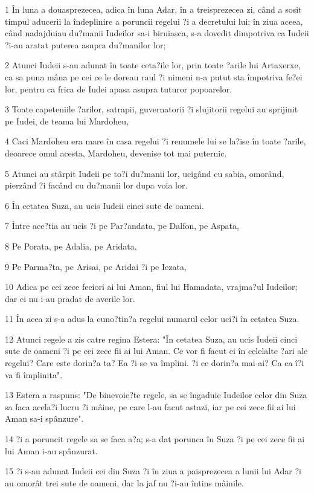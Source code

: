 \par 1 În luna a douasprezecea, adica în luna Adar, în a treisprezecea zi, când a sosit timpul aducerii la îndeplinire a poruncii regelui ?i a decretului lui; în ziua aceea, când nadajduiau du?manii Iudeilor sa-i biruiasca, s-a dovedit dimpotriva ca Iudeii ?i-au aratat puterea asupra du?manilor lor;
\par 2 Atunci Iudeii s-au adunat în toate ceta?ile lor, prin toate ?arile lui Artaxerxe, ca sa puna mâna pe cei ce le doreau raul ?i nimeni n-a putut sta împotriva fe?ei lor, pentru ca frica de Iudei apasa asupra tuturor popoarelor.
\par 3 Toate capeteniile ?arilor, satrapii, guvernatorii ?i slujitorii regelui au sprijinit pe Iudei, de teama lui Mardoheu,
\par 4 Caci Mardoheu era mare în casa regelui ?i renumele lui se la?ise în toate ?arile, deoarece omul acesta, Mardoheu, devenise tot mai puternic.
\par 5 Atunci au stârpit Iudeii pe to?i du?manii lor, ucigând cu sabia, omorând, pierzând ?i facând cu du?manii lor dupa voia lor.
\par 6 În cetatea Suza, au ucis Iudeii cinci sute de oameni.
\par 7 Între ace?tia au ucis ?i pe Par?andata, pe Dalfon, pe Aspata,
\par 8 Pe Porata, pe Adalia, pe Aridata,
\par 9 Pe Parma?ta, pe Arisai, pe Aridai ?i pe Iezata,
\par 10 Adica pe cei zece feciori ai lui Aman, fiul lui Hamadata, vrajma?ul Iudeilor; dar ei nu i-au pradat de averile lor.
\par 11 În acea zi s-a adus la cuno?tin?a regelui numarul celor uci?i în cetatea Suza.
\par 12 Atunci regele a zis catre regina Estera: "În cetatea Suza, au ucis Iudeii cinci sute de oameni ?i pe cei zece fii ai lui Aman. Ce vor fi facut ei în celelalte ?ari ale regelui? Care este dorin?a ta? Ea ?i se va împlini. ?i ce dorin?a mai ai? Ca ea î?i va fi împlinita".
\par 13 Estera a raspuns: "De binevoie?te regele, sa se îngaduie Iudeilor celor din Suza sa faca acela?i lucru ?i mâine, pe care l-au facut astazi, iar pe cei zece fii ai lui Aman sa-i spânzure".
\par 14 ?i a poruncit regele sa se faca a?a; s-a dat porunca în Suza ?i pe cei zece fii ai lui Aman i-au spânzurat.
\par 15 ?i s-au adunat Iudeii cei din Suza ?i în ziua a paisprezecea a lunii lui Adar ?i au omorât trei sute de oameni, dar la jaf nu ?i-au întins mâinile.
